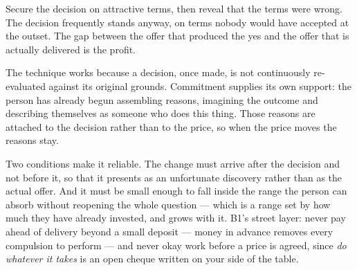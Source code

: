 


\begin{core}
Secure the decision on attractive terms, then reveal that the terms were wrong. The decision frequently stands anyway, on terms nobody would have accepted at the outset. The gap between the offer that produced the yes and the offer that is actually delivered is the profit.
\end{core}

\begin{mechanism}
The technique works because a decision, once made, is not continuously re-evaluated against its original grounds. Commitment supplies its own support: the person has already begun assembling reasons, imagining the outcome and describing themselves as someone who does this thing. Those reasons are attached to the decision rather than to the price, so when the price moves the reasons stay.

Two conditions make it reliable. The change must arrive after the decision and not before it, so that it presents as an unfortunate discovery rather than as the actual offer. And it must be small enough to fall inside the range the person can absorb without reopening the whole question --- which is a range set by how much they have already invested, and grows with it. B1's street layer: never pay ahead of delivery beyond a small deposit --- money in advance removes every compulsion to perform --- and never okay work before a price is agreed, since \emph{do whatever it takes} is an open cheque written on your side of the table.
\end{mechanism}

